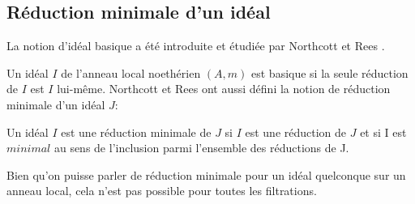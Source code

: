 \subsection{Réduction minimale d'un idéal}
La notion d'idéal basique a été introduite et étudiée par Northcott et Rees \cite{No}.
\begin{madefinition}
	Un idéal $I$ de l'anneau local noethérien $(A,m)$ est basique si la seule réduction de $I$ est $I$ lui-m\^{e}me. 
	Northcott et Rees ont aussi défini la notion de réduction minimale d'un idéal $J$:
	
	Un idéal $I$ est une réduction minimale de $J$ si $I$ est une réduction de $J$ et si I est $minimal$ au sens de l'inclusion parmi l'ensemble des réductions de J. 
\end{madefinition}
\begin{maremarque}
	Bien qu'on puisse parler de réduction minimale pour un idéal quelconque sur un anneau local, cela n'est pas possible pour toutes les filtrations. 

\end{maremarque}
